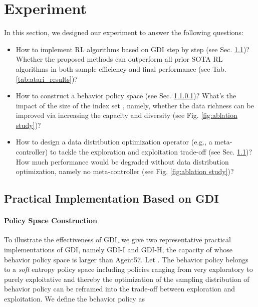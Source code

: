 \documentclass[nohyperref]{article}
\theoremstyle{plain}
\begin{document}
\section{Experiment}
\label{sec: experiment}
In this section, we designed our experiment to answer the following questions:
\begin{itemize}
    \item How to implement RL algorithms based on GDI step by step (see Sec. \ref{sec: Practical Implement Based on GDI})?  Whether the proposed methods can outperform all prior SOTA RL algorithms in both sample efficiency and final performance  (see Tab. \ref{tab:atari_results})?
    \item How to construct a behavior policy space (see Sec. \ref{sec: Policy Space Construction})? What's the impact of the size of the index set , namely, whether the data richness can be improved via increasing the capacity and diversity (see Fig. \ref{fig:ablation study})?
    \item How to design a data distribution optimization operator (e.g., a meta-controller) to tackle the exploration and exploitation trade-off (see Sec. \ref{sec: Practical Implement Based on GDI})? How much performance would be degraded without data distribution optimization, namely no meta-controller (see Fig. \ref{fig:ablation study})?
\end{itemize}

\subsection{Practical Implementation Based on GDI}
\label{sec: Practical Implement Based on GDI}


\paragraph{Policy Space Construction}
\label{sec: Policy Space Construction}

To illustrate the effectiveness of GDI, we give two representative practical implementations of GDI, namely GDI-I and GDI-H, the capacity of whose behavior policy space is larger than Agent57.  Let .
The behavior policy belongs to a \emph{soft} entropy policy space including policies ranging from very exploratory to purely exploitative and thereby the optimization of the sampling distribution  of behavior policy  can be reframed into the trade-off between exploration and exploitation.
We define the behavior policy  as
\end{document}
